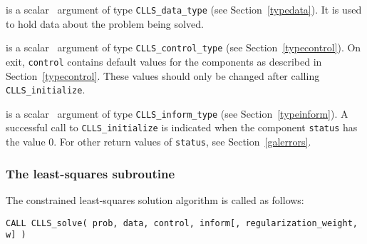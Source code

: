 \documentclass{galahad}
\newcommand{\packagename}{CLLS}
\begin{document}
\vspace*{-3mm}
\begin{description}

 is a scalar \intentinout\ argument of type
{\tt \packagename\_data\_type}
(see Section~\ref{typedata}). It is used to hold data about the problem being
solved.

 is a scalar \intentout\ argument of type
{\tt \packagename\_control\_type}
(see Section~\ref{typecontrol}).
On exit, {\tt control} contains default values for the components as
described in Section~\ref{typecontrol}.
These values should only be changed after calling
{\tt \packagename\_initialize}.

 is a scalar \intentout\ argument of type
{\tt \packagename\_inform\_type}
(see Section~\ref{typeinform}). A successful call to
{\tt \packagename\_initialize}
is indicated when the  component {\tt status} has the value 0.
For other return values of {\tt status}, see Section~\ref{galerrors}.

\end{description}


\subsubsection{The least-squares subroutine}\label{qps}
The constrained least-squares solution algorithm is called as follows:
\vspace*{1mm}

\hspace{8mm}
{\tt CALL \packagename\_solve( prob, data, control, inform[, regularization\_weight, w] )}
\end{document}
